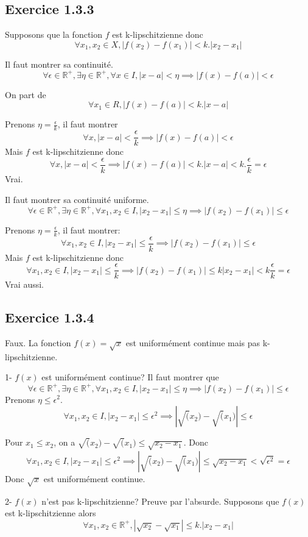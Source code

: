 \documentclass[]{book}
\theoremstyle{definition}
\newcommand{\bb}[1]{\mathbb{#1}}
\newcommand{\R}{\bb{R}}
\begin{document}
\subsection*{Exercice 1.3.3}
Supposons que la fonction $f$ est k-lipschitzienne donc 
$$
\forall x_1, x_2 \in X, |f(x_2)-f(x_1)| < k.|x_2-x_1|
$$

Il faut montrer sa continuit\'e.
$$
\forall \epsilon \in \R^{+}, \exists \eta  \in \R^{+}, \forall x \in I, |x-a| < \eta \implies  |f(x)-f(a)| < \epsilon
$$

On part de 
$$
\forall x_1 \in R, |f(x)-f(a)| < k.|x-a|
$$

Prenons $\eta = \frac{\epsilon}{k}$, il faut montrer 
$$
\forall x, |x-a| < \frac{\epsilon}{k} \implies  |f(x)-f(a)| < \epsilon
$$
Mais $f$ est k-lipschitzienne donc
$$
\forall x, |x-a| < \frac{\epsilon}{k} \implies  |f(x)-f(a)| < k.|x-a| < k. \frac{\epsilon}{k} = \epsilon
$$
Vrai.

Il faut montrer sa continuit\'e uniforme.
$$
\forall \epsilon \in \R^{+}, \exists \eta  \in \R^{+}, \forall x_1, x_2 \in I, |x_2-x_1| \leq \eta \implies  |f(x_2)-f(x_1)| \leq \epsilon
$$

Prenons $\eta = \frac{\epsilon}{k}$, il faut montrer: 
$$
\forall x_1, x_2 \in I, |x_2-x_1| \leq \frac{\epsilon}{k} \implies  |f(x_2)-f(x_1)| \leq \epsilon
$$
Mais $f$ est k-lipschitzienne donc
$$
\forall x_1, x_2 \in I, |x_2-x_1| \leq \frac{\epsilon}{k} \implies  |f(x_2)-f(x_1)| \leq k|x_2-x_1| < k\frac{\epsilon}{k} = \epsilon
$$
Vrai aussi.


\subsection*{Exercice 1.3.4}
Faux. La fonction $f(x) = \sqrt{x}$ est uniform\'ement continue mais pas k-lipschitzienne.

1- $f(x)$ est uniform\'ement continue? Il faut montrer que 
$$
\forall \epsilon \in \R^{+}, \exists \eta  \in \R^{+}, \forall x_1, x_2 \in I, |x_2-x_1| \leq \eta \implies  |f(x_2)-f(x_1)| \leq \epsilon
$$
Prenons $\eta \leq \epsilon^2$.
$$
\forall x_1, x_2 \in I, |x_2-x_1| \leq \epsilon^2 \implies  |\sqrt(x_2)-\sqrt(x_1)| \leq \epsilon
$$

Pour $x_1 \leq x_2$, on a $\sqrt(x_2)-\sqrt(x_1) \leq \sqrt{x_2 - x_1}$. Donc
$$
\forall x_1, x_2 \in I, |x_2-x_1| \leq \epsilon^2 \implies  |\sqrt(x_2)-\sqrt(x_1)| \leq \sqrt{x_2 - x_1} < \sqrt{\epsilon^2} = \epsilon
$$
Donc $\sqrt{x}$ est uniform\'ement continue.


2- $f(x)$ n'est pas k-lipschitzienne? Preuve par l'absurde. Supposons que $f(x)$ est k-lipschitzienne alors
$$
\forall x_1, x_2 \in \R^{+}, |\sqrt{x_2} - \sqrt{x_1}| \leq k.|x_2 - x_1|
$$
\end{document}
